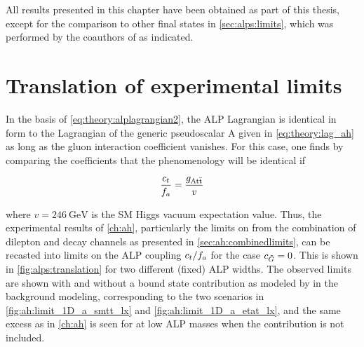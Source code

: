 All results presented in this chapter have been obtained as part of this thesis, except for the comparison to other final states in \cref{sec:alps:limits}, which was performed by the coauthors of  as indicated.


\section{Translation of experimental limits}
\label{sec:alps:translation}

In the basis of \cref{eq:theory:alplagrangian2}, the ALP Lagrangian is identical in form to the Lagrangian of the generic pseudoscalar A given in \cref{eq:theory:lag_ah} as long as the gluon interaction coefficient \cG vanishes. For this case, one finds by comparing the coefficients that the phenomenology will be identical if

\begin{equation}
    \frac{c_t}{f_a} = \frac{g_{\mathrm{A t \bar{t}}}}{v}
\end{equation}

\noindent where $v=\SI{246}{\GeV}$ is the SM Higgs vacuum expectation value. Thus, the experimental results of \cref{ch:ah}, particularly the limits on \gAtt from the combination of dilepton and \ljets decay channels as presented in \cref{sec:ah:combinedlimits}, can be recasted into limits on the ALP coupling $c_t/f_a$ for the case $c_{\tilde{G}} = 0$. This is shown in \cref{fig:alps:translation} for two different (fixed) ALP widths.
The observed limits are shown with and without a \ttbar bound state contribution as modeled by \etat in the background modeling, corresponding to the two scenarios in \cref{fig:ah:limit_1D_a_smtt_lx} and \cref{fig:ah:limit_1D_a_etat_lx}, and the same excess as in \cref{ch:ah} is seen for at low ALP masses when the \etat contribution is not included.

